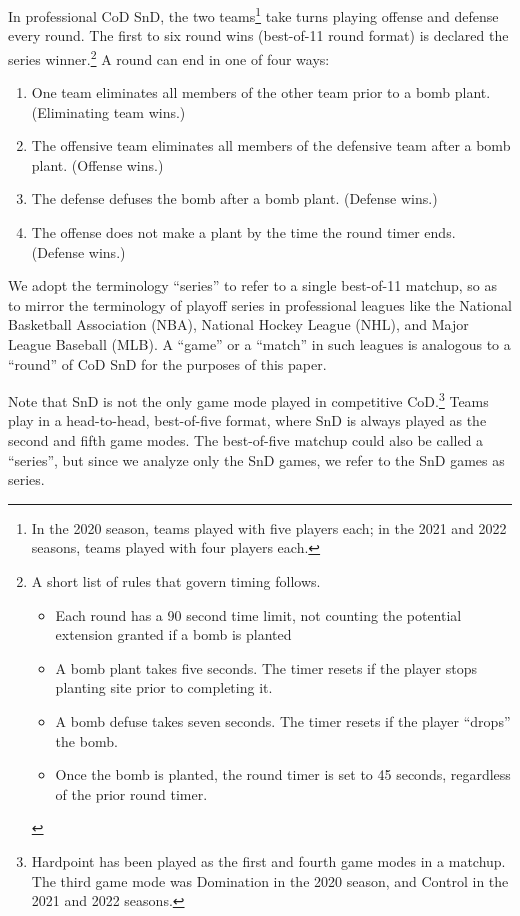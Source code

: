 \documentclass{article}
\providecommand{\tightlist}{%
  \setlength{\itemsep}{0pt}\setlength{\parskip}{0pt}}
\begin{document}
In professional CoD SnD, the two teams\footnote{In the 2020 season,
  teams played with five players each; in the 2021 and 2022 seasons,
  teams played with four players each.} take turns playing offense and
defense every round. The first to six round wins (best-of-11 round
format) is declared the series winner.\footnote{A short list of rules
  that govern timing follows.

  \begin{itemize}
  \tightlist
  \item
    Each round has a 90 second time limit, not counting the potential
    extension granted if a bomb is planted
  \item
    A bomb plant takes five seconds. The timer resets if the player
    stops planting site prior to completing it.
  \item
    A bomb defuse takes seven seconds. The timer resets if the player
    ``drops'' the bomb.
  \item
    Once the bomb is planted, the round timer is set to 45 seconds,
    regardless of the prior round timer.
  \end{itemize}} A round can end in one of four ways:

\begin{enumerate}
\def\labelenumi{\arabic{enumi}.}
\tightlist
\item
  One team eliminates all members of the other team prior to a bomb
  plant. (Eliminating team wins.)
\item
  The offensive team eliminates all members of the defensive team after
  a bomb plant. (Offense wins.)
\item
  The defense defuses the bomb after a bomb plant. (Defense wins.)
\item
  The offense does not make a plant by the time the round timer ends.
  (Defense wins.)
\end{enumerate}

We adopt the terminology ``series'' to refer to a single best-of-11
matchup, so as to mirror the terminology of playoff series in
professional leagues like the National Basketball Association (NBA),
National Hockey League (NHL), and Major League Baseball (MLB). A
``game'' or a ``match'' in such leagues is analogous to a ``round'' of
CoD SnD for the purposes of this paper.

Note that SnD is not the only game mode played in competitive
CoD.\footnote{Hardpoint has been played as the first and fourth game
  modes in a matchup. The third game mode was Domination in the 2020
  season, and Control in the 2021 and 2022 seasons.} Teams play in a
head-to-head, best-of-five format, where SnD is always played as the
second and fifth game modes. The best-of-five matchup could also be
called a ``series'', but since we analyze only the SnD games, we refer
to the SnD games as series.
\end{document}
